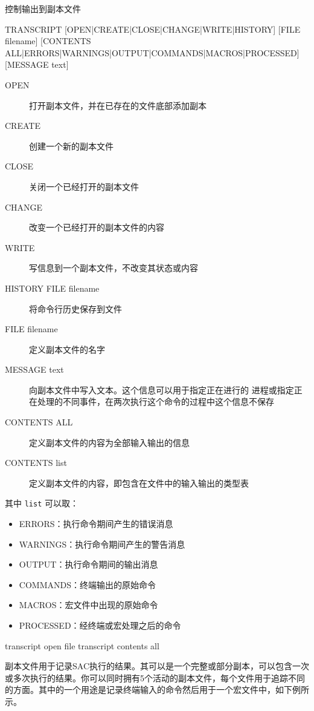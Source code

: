 \label{cmd:transcript}

控制输出到副本文件

\begin{SACSTX}
TRANSCRIPT [OPEN|CREATE|CLOSE|CHANGE|WRITE|HISTORY] [FILE filename]
    [CONTENTS ALL|ERRORS|WARNINGS|OUTPUT|COMMANDS|MACROS|PROCESSED]
    [MESSAGE text]
\end{SACSTX}

\begin{description}
\item [OPEN] 打开副本文件，并在已存在的文件底部添加副本
\item [CREATE] 创建一个新的副本文件
\item [CLOSE] 关闭一个已经打开的副本文件
\item [CHANGE] 改变一个已经打开的副本文件的内容
\item [WRITE] 写信息到一个副本文件，不改变其状态或内容
\item [HISTORY FILE filename] 将命令行历史保存到文件
\item [FILE filename] 定义副本文件的名字
\item [MESSAGE text] 向副本文件中写入文本。这个信息可以用于指定正在进行的
    进程或指定正在处理的不同事件，在两次执行这个命令的过程中这个信息不保存
\item [CONTENTS ALL] 定义副本文件的内容为全部输入输出的信息
\item [CONTENTS list] 定义副本文件的内容，即包含在文件中的输入输出的类型表
\end{description}
其中 \texttt{list} 可以取：
\begin{itemize}
\item ERRORS：执行命令期间产生的错误消息
\item WARNINGS：执行命令期间产生的警告消息
\item OUTPUT：执行命令期间的输出消息
\item COMMANDS：终端输出的原始命令
\item MACROS：宏文件中出现的原始命令
\item PROCESSED：经终端或宏处理之后的命令
\end{itemize}

\begin{SACDFT}
transcript open file transcript contents all
\end{SACDFT}

副本文件用于记录SAC执行的结果。其可以是一个完整或部分副本，可以包含一次
或多次执行的结果。你可以同时拥有5个活动的副本文件，每个文件用于追踪不同
的方面。其中的一个用途是记录终端输入的命令然后用于一个宏文件中，如下例所示。

